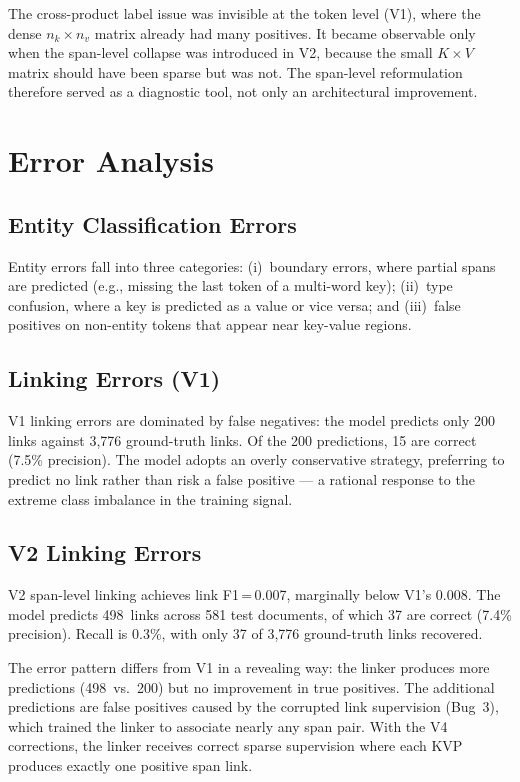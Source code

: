 \noindent The cross-product label issue was invisible at the token level
(V1), where the dense $n_k \times n_v$ matrix already had many positives.
It became observable only when the span-level collapse was introduced in V2,
because the small $K \times V$ matrix should have been sparse but was not.
The span-level reformulation therefore served as a diagnostic
tool, not only an architectural improvement.

\section{Error Analysis}
\label{sec:error_analysis}

\subsection{Entity Classification Errors}

Entity errors fall into three categories: (i)~boundary errors, where partial
spans are predicted (e.g., missing the last token of a multi-word key);
(ii)~type confusion, where a key is predicted as a value or vice versa; and
(iii)~false positives on non-entity tokens that appear near key-value regions.

\subsection{Linking Errors (V1)}

V1 linking errors are dominated by false negatives: the model predicts only
200 links against 3{,}776 ground-truth links. Of the 200 predictions, 15
are correct (7.5\% precision). The model adopts an overly conservative
strategy, preferring to predict no link rather than risk a false positive ---
a rational response to the extreme class imbalance in the training signal.

\subsection{V2 Linking Errors}

V2 span-level linking achieves link F1\,=\,0.007, marginally below V1's
0.008.  The model predicts 498~links across 581 test documents, of which
37 are correct (7.4\% precision).  Recall is 0.3\%, with only 37 of
3{,}776 ground-truth links recovered.

The error pattern differs from V1 in a revealing way: the linker produces
more predictions (498~vs.\ 200) but no improvement in true positives.  The
additional predictions are false positives caused by the corrupted
link supervision (Bug~3), which trained the linker to associate nearly any
span pair.  With the V4 corrections, the linker receives correct sparse
supervision where each KVP produces exactly one positive span link.

